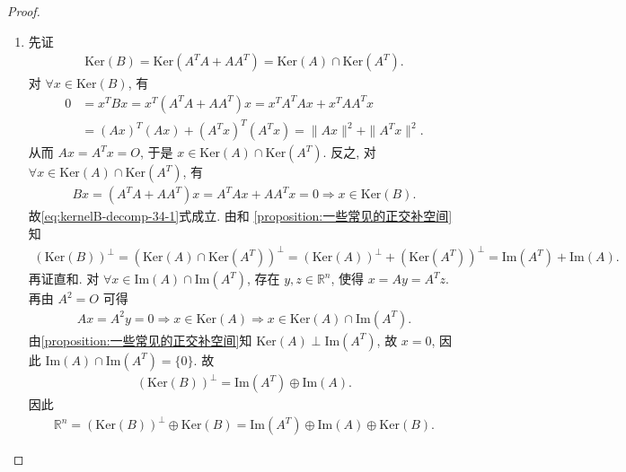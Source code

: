 \documentclass[../../main.tex]{subfiles}%
\begin{document}
\begin{proof}
\begin{enumerate}[(1)]
\item 先证
\begin{align}
\mathrm{Ker}(B)=\mathrm{Ker}(A^TA+AA^T)=\mathrm{Ker}(A)\cap \mathrm{Ker}(A^T).\label{eq:kernelB-decomp-34-1}
\end{align}
对 $\forall x\in \mathrm{Ker}(B)$, 有
\begin{align*}
0&=x^TBx=x^T(A^TA+AA^T)x=x^TA^TAx+x^TAA^Tx\\
&=(Ax)^T(Ax)+(A^Tx)^T(A^Tx)=\|Ax\|^2+\|A^Tx\|^2.
\end{align*}
从而 $Ax=A^Tx=O$, 于是 $x\in \mathrm{Ker}(A)\cap \mathrm{Ker}(A^T)$. 反之, 对 $\forall x\in \mathrm{Ker}(A)\cap \mathrm{Ker}(A^T)$, 有
\begin{align*}
Bx=(A^TA+AA^T)x=A^TAx+AA^Tx=0\Longrightarrow x\in \mathrm{Ker}(B).
\end{align*}
故\eqref{eq:kernelB-decomp-34-1}式成立. 由和
\cref{proposition:一些常见的正交补空间}知
\begin{align*}
(\mathrm{Ker}(B))^\bot=(\mathrm{Ker}(A)\cap \mathrm{Ker}(A^T))^\bot=(\mathrm{Ker}(A))^\bot+(\mathrm{Ker}(A^T))^\bot=\mathrm{Im}(A^T)+\mathrm{Im}(A).
\end{align*}
再证直和. 对 $\forall x\in \mathrm{Im}(A)\cap \mathrm{Im}(A^T)$, 存在 $y,z\in \mathbb{R}^n$, 使得 $x=Ay=A^Tz$. 再由 $A^2=O$ 可得
\begin{align*}
Ax=A^2y=0\Longrightarrow x\in \mathrm{Ker}(A)\Longrightarrow x\in \mathrm{Ker}(A)\cap \mathrm{Im}(A^T).
\end{align*}
由\cref{proposition:一些常见的正交补空间}知 $\mathrm{Ker}(A)\perp \mathrm{Im}(A^T)$, 故 $x=0$, 因此 $\mathrm{Im}(A)\cap \mathrm{Im}(A^T)=\{0\}$. 故
\begin{align*}
(\mathrm{Ker}(B))^\bot=\mathrm{Im}(A^T)\oplus \mathrm{Im}(A).
\end{align*}
因此
\begin{align*}
\mathbb{R}^n=(\mathrm{Ker}(B))^\bot\oplus \mathrm{Ker}(B)=\mathrm{Im}(A^T)\oplus \mathrm{Im}(A)\oplus \mathrm{Ker}(B).
\end{align*}
\end{enumerate}
\end{proof}
\end{document}
